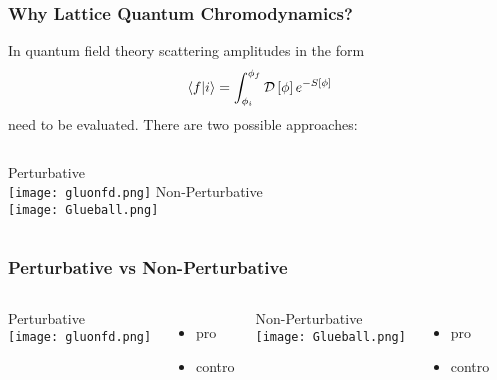\documentclass{beamer}
\begin{document}
\begin{frame}
  \titlepage
\end{frame}

\begin{frame}
  \frametitle{Why Lattice Quantum Chromodynamics?}
  \centering
  In quantum field theory scattering amplitudes in the form
  \begin{equation*}
    \bra{f}\ket{i} = \int_{\phi_i}^{\phi_f}\mathcal{D}\left[\phi\right] e^{-S[\phi]}
  \end{equation*}
  need to be evaluated.
  There are two possible approaches:
  \vspace{\baselineskip}
  \begin{columns}[t]
    \centering
    Perturbative\\
    \vspace{\baselineskip}
    \texttt{[image: gluonfd.png]}
    \centering
    Non-Perturbative\\
    \vspace{\baselineskip}
    \texttt{[image: Glueball.png]}
  \end{columns}
\end{frame}

\begin{frame}
  \frametitle{Perturbative vs Non-Perturbative}
  \centering
  \begin{columns}[t]
    \centering
    Perturbative\\
    \vspace{\baselineskip}
    \texttt{[image: gluonfd.png]}\\
    \vspace{\baselineskip}
    \begin{itemize}
     \item pro
     \item contro
    \end{itemize}
    \centering
    Non-Perturbative\\
    \vspace{\baselineskip}
    \texttt{[image: Glueball.png]}\\
    \vspace{\baselineskip}
    \begin{itemize}
     \item pro
     \item contro
    \end{itemize}
  \end{columns}
\end{frame}
\end{document}
